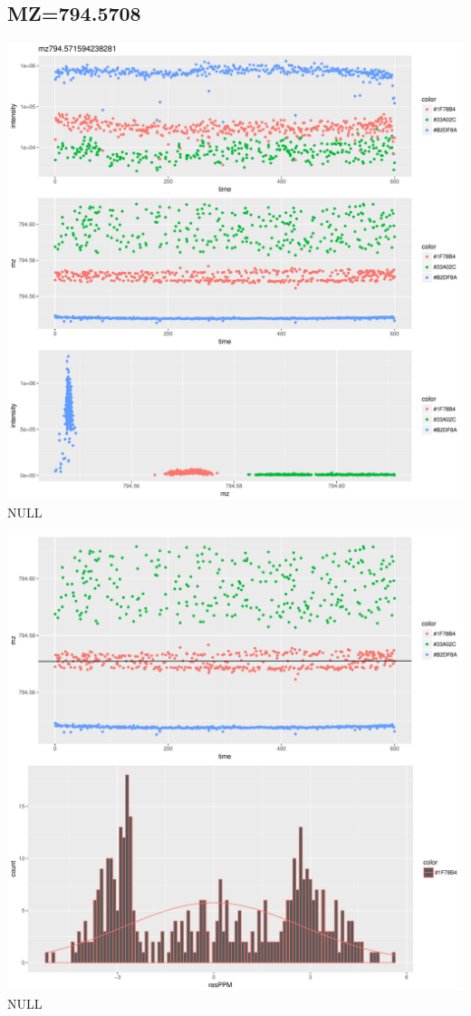 \documentclass[]{article}
\begin{document}
\subsection{MZ=794.5708}\label{mz794.5708}

\includegraphics{Supplementary_document_files/figure-latex/cluster.mz.794-1.pdf}
NULL

\includegraphics{Supplementary_document_files/figure-latex/filter.lm.794-1.pdf}
NULL
\end{document}
